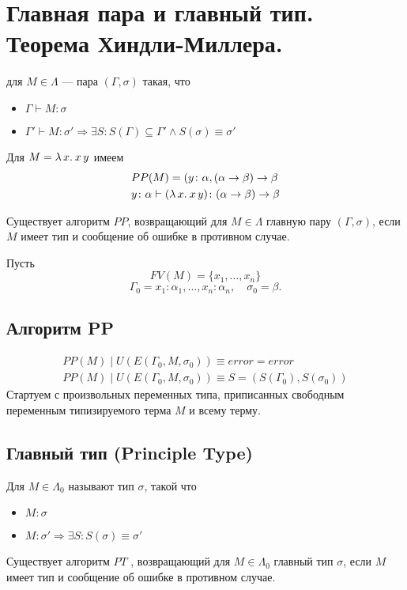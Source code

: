 \documentclass[11pt,a4paper]{article}
\begin{document}
\section{Главная пара и главный тип. Теорема Хиндли-Миллера.}
\begin{defn}
	 для $ M \in \Lambda$ --- пара $ ( \Gamma , \sigma )$ такая, что
	\begin{itemize}
		\item $ \Gamma \vdash M \colon \sigma $
		\item $ \Gamma ' \vdash M \colon \sigma ' \Longrightarrow \exists S \colon S(\Gamma) \subseteq \Gamma ' \wedge S(\sigma) \equiv \sigma '$
\end{itemize}
\end{defn}
\begin{ex}
	Для $M = \lambda\,{x}.\:{x\, y}$ имеем
	\[
	\begin{aligned}
		&PP(M) = (y\colon \alpha , ( \alpha \to  \beta ) \to  \beta 
		\\
		& y\colon \alpha \vdash (\lambda\,{x}.\:{x\,y})\colon ( \alpha \to \beta ) \to \beta 
	\end{aligned}
	\]
\end{ex}
\begin{thm}
Существует алгоритм $PP$, возвращающий для $M \in  \Lambda$ главную пару $(\Gamma , \sigma )$, если $ M$ имеет тип и сообщение об ошибке в противном случае.
\end{thm}
Пусть 
\[
	FV(M) = \{x_1 , \ldots  , x_n \}
\]
\[
	\Gamma_ 0 = {x_1 \colon  \alpha _1 , \ldots  , x_n \colon  \alpha _n }, \quad\sigma_0 = \beta 
.\] 
\subsection{Алгоритм PP}
\[
\begin{aligned}
PP(M) \mid U(E(\Gamma_0 , M, \sigma _0 )) \equiv  error = error \\
PP(M) \mid U(E(\Gamma_0 , M, \sigma _ 0 )) \equiv  S = (S(\Gamma_0 ), S(\sigma_0 ))
\end{aligned}
\]
Стартуем с произвольных переменных типа, приписанных свободным переменным типизируемого терма $M$ и всему терму.

\subsection{Главный тип (Principle Type)}
\begin{defn}
	Для $M \in  \Lambda_0$  называют тип $ \sigma $, такой что
	\begin{itemize}
		\item
			$ M \colon \sigma $
		\item $ M \colon \sigma ' \Longrightarrow \exists S\colon S(\sigma) \equiv \sigma '$
\end{itemize}
\end{defn}
\begin{cor}
Существует алгоритм $PT$ , возвращающий для $M \in  \Lambda_0$ главный тип $ \sigma $, если $ M$ имеет тип и сообщение об ошибке в противном случае.
\end{cor}
\end{document}

